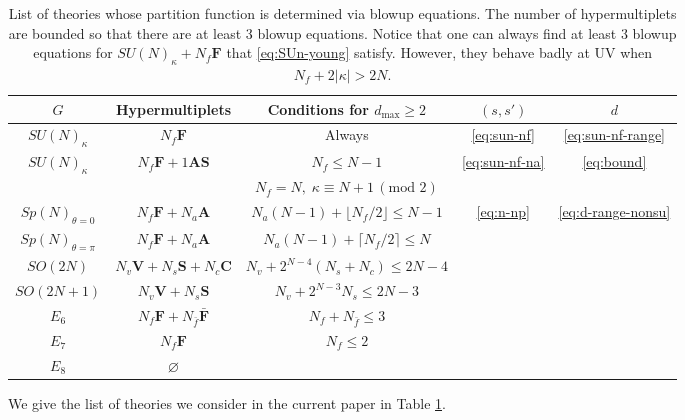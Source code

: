 \documentclass[letterpaper, 11pt]{article}
\begin{document}
{\begin{table}[t!]
  \centering
  \begin{tabular}{|c|c|c|c|c|}
    \hline
    $G$ & Hypermultiplets & Conditions for $d_{\text{max}}\ge 2$ &   $(s, s')$ & $d$ \\
    \hline \hline
    $SU(N)_\kappa$ & $N_f \mathbf{F}$ & Always  &    \eqref{eq:sun-nf} & \eqref{eq:sun-nf-range} \\
    \cline{1-5}
    \multirow{2}{*}{$SU(N)_\kappa$} & \multirow{2}{*}{$N_f \mathbf{F}+1\textbf{AS}$} & $N_f \le N-1$ &    \multirow{2}{*}{\eqref{eq:sun-nf-na}} & \multirow{2}{*}{\eqref{eq:bound}} \\\cline{3-3}
	& & $N_f=N,\; \kappa\equiv N+1\,(\text{mod } 2)$ & & \\
    \cline{1-5}
    $Sp(N)_{\theta=0}$ & $N_f\mathbf{F}+N_a \mathbf{A}$ & $N_a(N-1)+\lfloor N_f/2\rfloor\leq  N-1$ &   \multirow{7}{*}{\eqref{eq:n-np}}& \multirow{7}{*}{\eqref{eq:d-range-nonsu}} \\
    \cline{1-3}
    $Sp(N)_{\theta=\pi}$ & $N_f\mathbf{F}+N_a\mathbf{A}$ & $N_a(N-1)+\lceil N_f/2\rceil\le  N$ & & \\
    \cline{1-3}
    $SO(2N)$ & $N_v\mathbf{V}+N_s\mathbf{S}+N_c\mathbf{C}$ & $N_v+2^{N-4}(N_s+N_c) \le  2N-4$ &  & \\
    \cline{1-3}
    $SO(2N+1)$ & $N_v\mathbf{V}+N_s\mathbf{S}$ & $N_v+2^{N-3}N_s \le 2 N-3$ & &   \\
    \cline{1-3}
    $E_6$ & $N_f\mathbf{F}+N_{\bar{f}}\mathbf{\bar{F}}$ & $N_f+N_{\bar{f}} \le 3 $ & &   \\
    \cline{1-3}
    $E_7$ & $N_f\mathbf{F}$ & $N_f \le 2$ & &   \\
    \cline{1-3}
    $E_8$ & $\varnothing$ &  & &   \\
    \hline
    \end{tabular}
    \caption{List of theories whose partition function is determined via blowup equations. The number of hypermultiplets are bounded so that there are at least 3 blowup equations. Notice that one can always find at least 3 blowup equations for $SU(N)_\kappa+N_{f}\mathbf{F}$ that \eqref{eq:SUn-young} satisfy. However, they behave badly at UV when $N_f+2|\kappa|>2N$.  }
    \label{tbl:list}
\end{table}
We give the list of theories we consider in the current paper in Table \ref{tbl:list}. 





}
\end{document}
